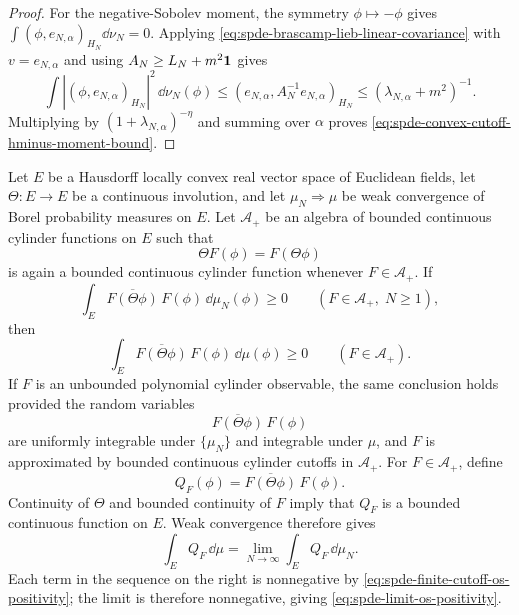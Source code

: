 \begin{proof}
For the negative-Sobolev moment, the symmetry
\(\phi\mapsto-\phi\) gives
\(\int(\phi,e_{N,\alpha})_{H_N}\dd\nu_N=0\).  Applying
\eqref{eq:spde-brascamp-lieb-linear-covariance} with
\(v=e_{N,\alpha}\) and using \(A_N\geq L_N+m^2{\bf 1}\) gives
\[
  \int |(\phi,e_{N,\alpha})_{H_N}|^2\,\dd\nu_N(\phi)
  \leq
  (e_{N,\alpha},A_N^{-1}e_{N,\alpha})_{H_N}
  \leq
  (\lambda_{N,\alpha}+m^2)^{-1}.
\]
Multiplying by \((1+\lambda_{N,\alpha})^{-\eta}\) and summing over
\(\alpha\) proves
\eqref{eq:spde-convex-cutoff-hminus-moment-bound}.
\end{proof}

\begin{remark}
\label{rem:spde-os-positivity-closed-under-weak-convergence}
Let \(E\) be a Hausdorff locally convex real vector space of Euclidean
fields, let \(\Theta:E\to E\) be a continuous involution, and let
\(\mu_N\Rightarrow\mu\) be weak convergence of Borel probability measures
on \(E\).  Let \(\mathcal A_+\) be an algebra of bounded continuous
cylinder functions on \(E\) such that
\[
  \Theta F(\phi)=F(\Theta\phi)
\]
is again a bounded continuous cylinder function whenever
\(F\in\mathcal A_+\).  If
\begin{equation}
  \int_E \overline{F(\Theta\phi)}\,F(\phi)\,\dd\mu_N(\phi)\geq0
  \qquad
  (F\in\mathcal A_+,\; N\geq1),
  \label{eq:spde-finite-cutoff-os-positivity}
\end{equation}
then
\begin{equation}
  \int_E \overline{F(\Theta\phi)}\,F(\phi)\,\dd\mu(\phi)\geq0
  \qquad(F\in\mathcal A_+).
  \label{eq:spde-limit-os-positivity}
\end{equation}
If \(F\) is an unbounded polynomial cylinder observable, the same conclusion
holds provided the random variables
\[
  \overline{F(\Theta\phi)}\,F(\phi)
\]
are uniformly integrable under \(\{\mu_N\}\) and integrable under \(\mu\),
and \(F\) is approximated by bounded continuous cylinder cutoffs in
\(\mathcal A_+\).
For \(F\in\mathcal A_+\), define
\[
  Q_F(\phi)=\overline{F(\Theta\phi)}\,F(\phi).
\]
Continuity of \(\Theta\) and bounded continuity of \(F\) imply that \(Q_F\)
is a bounded continuous function on \(E\).  Weak convergence therefore gives
\[
  \int_E Q_F\,\dd\mu
  =
  \lim_{N\to\infty}\int_E Q_F\,\dd\mu_N .
\]
Each term in the sequence on the right is nonnegative by
\eqref{eq:spde-finite-cutoff-os-positivity}; the limit is therefore
nonnegative, giving \eqref{eq:spde-limit-os-positivity}.


\end{remark}
